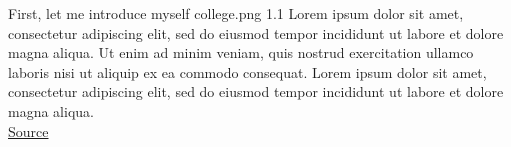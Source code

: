 \cvexample
  {First, let me introduce myself}
  {college.png}
  {1.1}
  {%
    Lorem ipsum dolor sit amet, consectetur adipiscing elit, sed do eiusmod tempor incididunt ut labore et dolore magna aliqua.
    Ut enim ad minim veniam, quis nostrud exercitation ullamco laboris nisi ut aliquip ex ea commodo consequat.
    Lorem ipsum dolor sit amet, consectetur adipiscing elit, sed do eiusmod tempor incididunt ut labore et dolore magna aliqua.\\
    \raggedleft\href{https://observablehq.com/@ryan-p-larson/higher-knowledge-graph}{Source}
}
